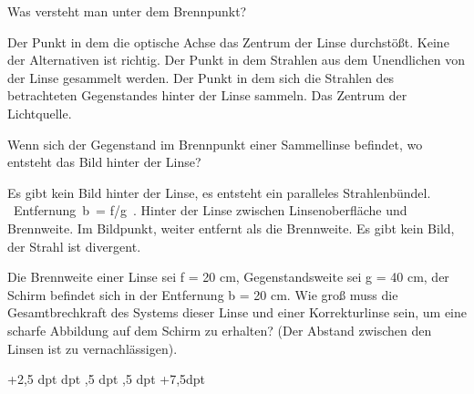 \documentclass[11pt]{exam}
\begin{document}
\setlength{\voffset}{-0.5in}
\setlength{\headsep}{5pt}

\hspace{2mm}
 \hspace{5mm}
\vspace{4mm}

\begin{questions}

\question Was versteht man unter dem Brennpunkt?

\begin{choices}
	\choice Der Punkt in dem die optische Achse das Zentrum der Linse durchstößt.
	\choice Keine der Alternativen ist richtig.
	\choice Der Punkt in dem Strahlen aus dem Unendlichen von der Linse gesammelt werden.
	\choice Der Punkt in dem sich die Strahlen des betrachteten Gegenstandes hinter der Linse sammeln.
	\choice Das Zentrum der Lichtquelle.
\end{choices}

\vspace{3mm}\question Wenn sich der Gegenstand im Brennpunkt einer Sammellinse befindet, wo entsteht das Bild hinter der Linse?

\begin{choices}
	\choice Es gibt kein Bild hinter der Linse, es entsteht ein paralleles Strahlenbündel.
	\choice  Entfernung b = f/g .
	\choice Hinter der Linse zwischen Linsenoberfläche und Brennweite.
	\choice Im Bildpunkt, weiter entfernt als die Brennweite.
	\choice Es gibt kein Bild, der Strahl ist divergent.
\end{choices}

\vspace{3mm}\question Die Brennweite einer Linse sei f = 20 cm, Gegenstandsweite sei g = 40 cm, der Schirm befindet sich in der Entfernung b = 20 cm. Wie groß muss die Gesamtbrechkraft des Systems dieser Linse und einer Korrekturlinse sein, um eine scharfe Abbildung auf dem Schirm zu erhalten? (Der Abstand zwischen den Linsen ist zu vernachlässigen).

\begin{choices}
	\choice +2,5 dpt
	 dpt
	,5 dpt
	,5 dpt
	\choice +7,5dpt
\end{choices}


\end{questions}
\end{document}
